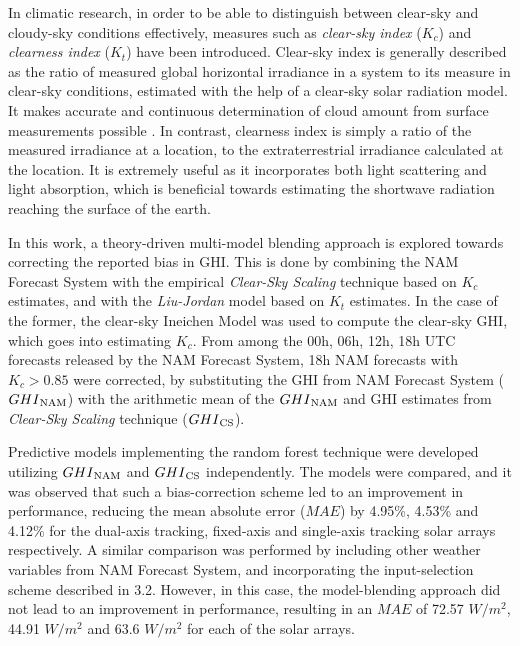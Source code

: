 \restoregeometry\noindent
\par In climatic research, in order to be able to distinguish between clear-sky and cloudy-sky conditions effectively, measures such as \textit{clear-sky index} ($K_c$) and \textit{clearness index} ($K_t$) have been introduced. Clear-sky index is generally described as the ratio of measured global horizontal irradiance in a system to its measure in clear-sky conditions, estimated with the help of a clear-sky solar radiation model. It makes accurate and continuous determination of cloud amount from surface measurements possible \cite{multimodel_clearskyindex}. In contrast, clearness index is simply a ratio of the measured irradiance at a location, to the extraterrestrial irradiance calculated at the location. It is extremely useful as it incorporates both light scattering and light absorption, which is beneficial towards estimating the shortwave radiation reaching the surface of the earth.

\par In this work, a theory-driven multi-model blending approach is explored towards correcting the reported bias in GHI. This is done by combining the NAM Forecast System with the empirical \textit{Clear-Sky Scaling} technique based on $K_c$ estimates, and with the \textit{Liu-Jordan} model based on $K_t$ estimates. In the case of the former, the clear-sky Ineichen Model was used to compute the clear-sky GHI, which goes into estimating $K_c$. From among the 00h, 06h, 12h, 18h UTC forecasts released by the NAM Forecast System, 18h NAM forecasts with $K_c > 0.85$ were corrected, by substituting the GHI from NAM Forecast System ($GHI\textsubscript{NAM}$) with the arithmetic mean of the $GHI\textsubscript{NAM}$ and GHI estimates from \textit{Clear-Sky Scaling} technique ($GHI\textsubscript{CS}$). 

\par Predictive models implementing the random forest technique were developed utilizing $GHI\textsubscript{NAM}$ and $GHI\textsubscript{CS}$ independently. The models were compared, and it was observed that such a bias-correction scheme led to an improvement in performance, reducing the mean absolute error ($MAE$) by 4.95\%, 4.53\% and 4.12\% for the dual-axis tracking, fixed-axis and single-axis tracking solar arrays respectively. A similar comparison was performed by including other weather variables from NAM Forecast System, and incorporating the input-selection scheme described in 3.2. However, in this case, the model-blending approach did not lead to an improvement in performance, resulting in an $MAE$ of 72.57 $W/m^2$, 44.91 $W/m^2$ and 63.6 $W/m^2$ for each of the solar arrays.

